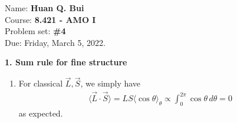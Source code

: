 \documentclass{article}
\theoremstyle{definition}
\begin{document}
\begin{framed}
\noindent Name: \textbf{Huan Q. Bui}\\
Course: \textbf{8.421 - AMO I}\\
Problem set: \textbf{\#4}\\
Due: Friday, March 5, 2022.
\end{framed}
	
	
\noindent \textbf{1. Sum rule for fine structure}

\begin{enumerate}[label=(\alph*)]
	\item For classical $\vec{L}, \vec{S}$, we simply have
	\begin{align*}
	\langle \vec{L} \cdot \vec{S} \rangle = LS\langle \cos\theta\rangle_\theta  \propto \int_0^{2\pi}\cos\theta\,d\theta = 0
	\end{align*}
	as expected. 
	

\end{enumerate}
\end{document}
